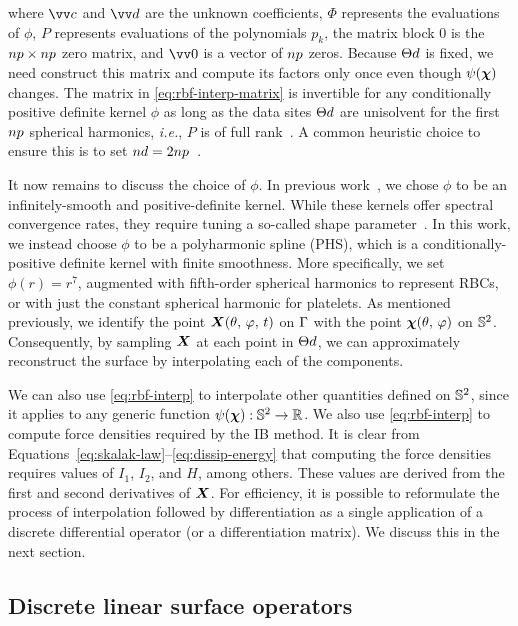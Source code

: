 where $\arr{c}$ and $\arr{d}$ are the unknown coefficients, $\Phi$ represents the evaluations of $\phi$, $P$ represents evaluations of the polynomials $p_k$, the matrix block $0$ is the $\poly\cardinality\times\poly\cardinality$ zero matrix, and $\arr{0}$ is a vector of $\poly\cardinality$ zeros. Because $\data\sites$ is fixed,
we need construct this matrix and compute its factors only once even though $\psi(\boldsymbol{\chi})$ changes. The matrix in \eqref{eq:rbf-interp-matrix} is invertible for any conditionally positive definite kernel $\phi$ as long as the data sites $\data\sites$ are unisolvent for the first $\poly\cardinality$ spherical harmonics, \emph{i.e.}, $P$ is of full rank~\cite{Fasshauer:2007ui}. A common heuristic choice to ensure this is to set $\data\cardinality = 2 \poly\cardinality$~\cite{SWJCP2018}. 

It now remains to discuss the choice of $\phi$. In previous work~\cite{Shankar:2015km}, we chose $\phi$ to be an infinitely-smooth and positive-definite kernel. While these kernels offer spectral convergence rates, they require tuning a so-called shape parameter~\cite{Fasshauer:2007ui}. In this work, we instead choose $\phi$ to be a polyharmonic spline (PHS), which is a conditionally-positive definite kernel with finite smoothness. More specifically, we set $\phi(r) = r^7$, augmented with fifth-order spherical harmonics to represent RBCs, or with just the constant spherical harmonic for platelets. As mentioned previously, we identify the point $\boldsymbol{X}(\theta,\,\varphi,\,t)$
on $\Gamma$ with the point $\boldsymbol{\chi}(\theta,\,\varphi)$ on $\mathbb{S}^2$. Consequently, by sampling $\boldsymbol{X}$ at each point in $\data\sites$,
we can approximately reconstruct the surface by interpolating each of the components. 

We can also use \eqref{eq:rbf-interp} to interpolate other quantities defined on $\mathbb{S}^2$, since it applies to any generic function $\psi(\boldsymbol{\chi}): \mathbb{S}^2 \to \mathbb{R}$. We also use \eqref{eq:rbf-interp} to compute force densities required by the IB method. It is clear from Equations~\eqref{eq:skalak-law}--\eqref{eq:dissip-energy} that computing the force densities requires values of $I_1$, $I_2$, and $H$, among others. These values are derived from the first and second derivatives of $\boldsymbol{X}$. For efficiency, it is possible to reformulate the process of interpolation followed by differentiation as a single application of a discrete differential operator (or a differentiation matrix). We discuss this in the next section.

\subsection{Discrete linear surface operators}

